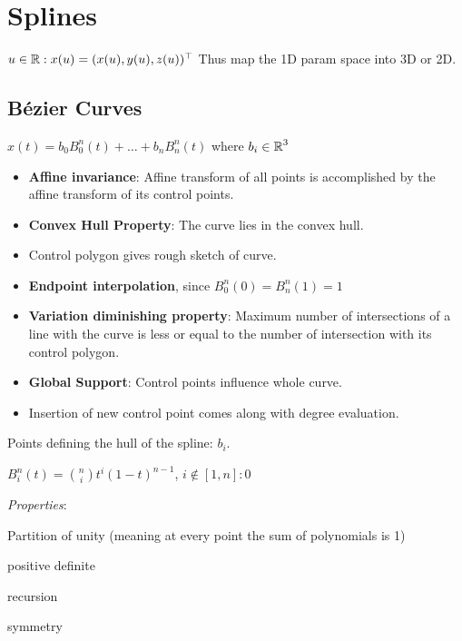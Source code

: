 \section{Splines}

\begin{definition}
  \(u \in \operatorname{\mathbb{R}}: x(u) = (x(u), y(u), z(u))^\top\)
  Thus map the 1D param space into 3D or 2D.
\end{definition}

\subsection{Bézier Curves}

\begin{center}
  \(x(t) = b_0B_0^n(t) + \ldots + b_n B_n^n(t)\) where \(b_i \in \operatorname{\mathbb{R}}^3\)
\end{center}

\begin{itemize}
  \item \textbf{Affine invariance}: Affine transform of all points is accomplished by the affine transform of its control points.
  \item \textbf{Convex Hull Property}: The curve lies in the convex hull.
  \item Control polygon gives rough sketch of curve.
  \item \textbf{Endpoint interpolation}, since \(B_0^n(0) = B_n^n(1) = 1\)
  \item \textbf{Variation diminishing property}: Maximum number of intersections of a line with the curve is less or equal to the number of intersection with its control polygon.
  \color{red}
  \item \textbf{Global Support}: Control points influence whole curve.
  \item Insertion of new control point comes along with degree evaluation.
\end{itemize}

\begin{definition}
  Points defining the hull of the spline: \(b_i\).
\end{definition}

\begin{definition}[Bernsteinpolynomial]
  \(B_i^n(t) = \binom{n}{i} t^i(1 - t)^{n-1}\), \(i \notin [1, n]: 0\)

  \textit{Properties}:
  \begin{itemize*}
    \item Partition of unity (meaning at every point the sum of polynomials is 1)
    \item positive definite
    \item recursion
    \item symmetry
  \end{itemize*}
\end{definition}

